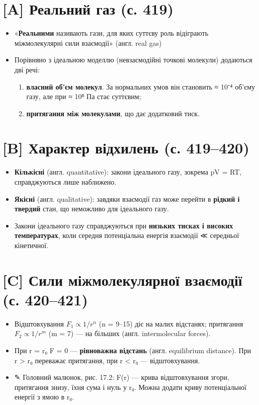 \documentclass[11pt,a4paper,oneside]{book}
\newcommand{\pen}{{\sffamily\color{accent}✎}}
\begin{document}
\section*{[A] Реальний газ (с. 419)}
\begin{itemize}
\item «\textbf{Реальними} називають гази, для яких суттєву роль відіграють міжмолекулярні сили взаємодії» (англ. real gas)
\item Порівняно з ідеальною моделлю (невзаємодійні точкові молекули) додаються дві речі:
\begin{enumerate}
\item \textbf{власний об'єм молекул}. За нормальних умов він становить ≈ 10⁻⁴ об'єму газу, але при ≈ 10⁸ Па стає суттєвим;
\item \textbf{притягання між молекулами}, що дає додатковий тиск.
\end{enumerate}
\end{itemize}

\section*{[B] Характер відхилень (с. 419–420)}
\begin{itemize}
\item \textbf{Кількісні} (англ. quantitative): закони ідеального газу, зокрема pV = RT, справджуються лише наближено.
\item \textbf{Якісні} (англ. qualitative): завдяки взаємодії газ може перейти в \textbf{рідкий і твердий} стан, що неможливо для ідеального газу.
\item Закони ідеального газу справджуються при \textbf{низьких тисках і високих температурах}, коли середня потенціальна енергія взаємодії ≪ середньої кінетичної.
\end{itemize}

\section*{[C] Сили міжмолекулярної взаємодії (с. 420–421)}
\begin{itemize}
\item Відштовхування $F_1 \propto 1/r^n$ (n = 9–15) діє на малих відстанях; притягання $F_2 \propto 1/r^m$ (m = 7) — на більших (англ. intermolecular forces).
\item При r = r₀ F = 0 — \textbf{рівноважна відстань} (англ. equilibrium distance). При r > r₀ переважає притягання, при r < r₀ — відштовхування.
\item \pen{} Головний малюнок, рис. 17.2: F(r) — крива відштовхування згори, притягання знизу, їхня сума і нуль у r₀. Можна додати криву потенціальної енергії з ямою в r₀.
\end{itemize}
\end{document}
